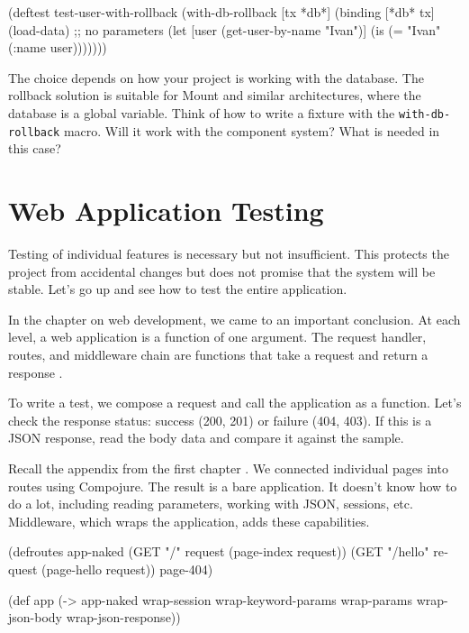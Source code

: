 \else

\begin{english}
  \begin{clojure}
(deftest test-user-with-rollback
  (with-db-rollback [tx *db*]
    (binding [*db* tx]
      (load-data) ;; no parameters
      (let [user (get-user-by-name "Ivan")]
        (is (= "Ivan" (:name user)))))))
  \end{clojure}
\end{english}

\fi

The choice depends on how your project is working with the database. The rollback solution is suitable for Mount and similar architectures, where the database is a global variable. Think of how to write a fixture with the \verb|with-db-rollback| macro. Will it work with the component system? What is needed in this case?

\section{Web Application Testing}


Testing of individual features is necessary but not insufficient. This protects the project from accidental changes but does not promise that the system will be stable. Let's go up and see how to test the entire application.

In the chapter on web development, we came to an important conclusion. At each level, a web application is a function of one argument. The request handler, routes, and middleware chain are functions that take a request and return a response .

To write a test, we compose a request and call the application as a function. Let's check the response status: success (200, 201) or failure (404, 403). If this is a JSON response, read the body data and compare it against the sample.

Recall the appendix from the first chapter . We connected individual pages into routes using Compojure. The result is a bare application. It doesn't know how to do a lot, including reading parameters, working with JSON, sessions, etc. Middleware, which wraps the application, adds these capabilities.


\ifnarrow

\begin{english}
  \begin{clojure}
(defroutes app-naked
  (GET "/"
    request (page-index request))
  (GET "/hello"
    request (page-hello request))
  page-404)

(def app
  (-> app-naked
      wrap-session
      wrap-keyword-params
      wrap-params
      wrap-json-body
      wrap-json-response))
  \end{clojure}
\end{english}

